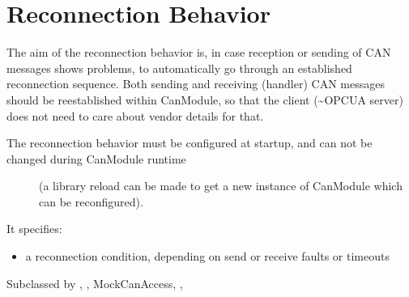 \documentclass[a4paper,10pt,english]{sphinxmanual}
\begin{document}
\chapter{Reconnection Behavior}
\label{\detokenize{reconnection:reconnection-behavior}}\label{\detokenize{reconnection::doc}}
\sphinxAtStartPar
The aim of the reconnection behavior is, in case reception or sending of CAN messages shows problems,
to automatically go through an established reconnection sequence. Both sending and receiving (handler)
CAN messages should be reestablished within CanModule, so that the client (\textasciitilde{}OPCUA server) does not
need to care about vendor details for that.
\begin{description}
\item[{The reconnection behavior must be configured at startup, and can not be changed during CanModule runtime}] \leavevmode
\sphinxAtStartPar
(a library reload can be made to get a new instance of CanModule which can be re\sphinxhyphen{}configured).

\end{description}

\sphinxAtStartPar
It specifies:
\begin{itemize}
\item {} 
\sphinxAtStartPar
a reconnection condition, depending on send or receive faults or timeouts

\end{itemize}

\begin{fulllineitems}
\label{\detokenize{reconnection:_CPPv4N9CanModule10CCanAccessE}}%
\pysigstartmultiline
{}%
\pysigstopmultiline
\sphinxAtStartPar
Subclassed by {\hyperref[\detokenize{classesdetails:classAnaCanScan}]{}}, {\hyperref[\detokenize{vendors/systec:classCSockCanScan}]{}}, MockCanAccess, {\hyperref[\detokenize{vendors/peak:classPKCanScan}]{}}, {\hyperref[\detokenize{classesdetails:classSTCanScan}]{}}

\end{fulllineitems}
\end{document}
